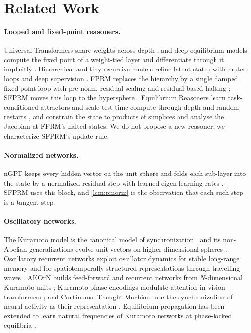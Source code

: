 \documentclass{article}
\theoremstyle{plain}
\theoremstyle{definition}
\theoremstyle{remark}
\begin{document}
\section{Related Work}
\label{sec:related}

\paragraph{Looped and fixed-point reasoners.} Universal Transformers share weights across depth
\citep{dehghani2019universal}, and deep equilibrium models compute the fixed point of a weight-tied
layer and differentiate through it implicitly \citep{bai2019deq}. Hierarchical and tiny recursive
models refine latent states with nested loops and deep supervision
\citep{wang2025hrm,jolicoeur2025trm}. FPRM replaces the hierarchy by a single damped fixed-point
loop with pre-norm, residual scaling and residual-based halting \citep{movahedi2026fprm}; SFPRM moves
this loop to the hypersphere \citep{sfprm}. Equilibrium Reasoners learn task-conditioned attractors
and scale test-time compute through depth and random restarts \citep{huang2026eqr}, and
\citet{daulbaev2026gfpr} constrain the state to products of simplices and analyse the Jacobian at
FPRM's halted states. We do not propose a new reasoner; we characterize SFPRM's update rule.

\paragraph{Normalized networks.} nGPT keeps every hidden vector on the unit sphere and folds each
sub-layer into the state by a normalized residual step with learned eigen learning rates
\citep{loshchilov2025ngpt}. SFPRM uses this block, and \cref{lem:renorm} is the observation that each
such step is a tangent step.

\paragraph{Oscillatory networks.} The Kuramoto model is the canonical model of synchronization
\citep{kuramoto1984,strogatz2000}, and its non-Abelian generalizations evolve unit vectors on
higher-dimensional spheres \citep{lohe2009}. Oscillatory recurrent networks exploit oscillator
dynamics for stable long-range memory \citep{rusch2021cornn} and for spatiotemporally structured
representations through travelling waves \citep{keller2023nwm}. AKOrN builds feed-forward and
recurrent networks from $N$-dimensional Kuramoto units \citep{miyato2025akorn}; Kuramoto phase
encodings modulate attention in vision transformers \citep{xiao2026kope}; and Continuous Thought
Machines use the synchronization of neural activity as their representation \citep{darlow2025ctm}.
Equilibrium propagation \citep{scellier2017ep} has been extended to learn natural frequencies of
Kuramoto networks at phase-locked equilibria \citep{ahmadi2026phase}.
\end{document}
